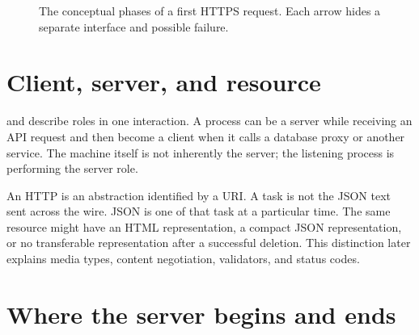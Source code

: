 \begin{figure}[htbp]
\centering
{}
\caption{The conceptual phases of a first HTTPS request. Each arrow hides a
separate interface and possible failure.}
\label{fig:request-journey}
\end{figure}

\section{Client, server, and resource}

 and  describe roles in one interaction. A process
can be a server while receiving an API request and then become a client when it
calls a database proxy or another service. The machine itself is not inherently
the server; the listening process is performing the server role.

An HTTP  is an abstraction identified by a URI. A task is not
the JSON text sent across the wire. JSON is one  of that
task at a particular time. The same resource might have an HTML representation,
a compact JSON representation, or no transferable representation after a
successful deletion. This distinction later explains media types, content
negotiation, validators, and status codes.

\section{Where the server begins and ends}

